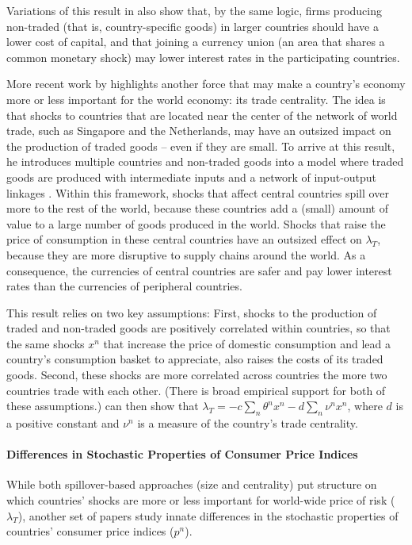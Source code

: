 \documentclass{ar-1col}
\begin{document}
Variations of this result in \citet{Hassan2013} also show that, by the same logic, firms producing non-traded (that is, country-specific goods) in larger countries should have a lower cost of capital, and that joining a currency union (an area that shares a common monetary shock) may lower interest rates in the participating countries.

More recent work by \citet{Richmond2019} highlights another force that may make a country's economy more or less important for the world economy: its trade centrality. The idea is that shocks to countries that are located near the center of the network of world trade, such as Singapore and the Netherlands, may have an outsized impact on the production of traded goods -- even if they are small. To arrive at this result, he introduces multiple countries and non-traded goods into a model where traded goods are produced with intermediate inputs and a network of input-output linkages \citep{LongPlosser1983, Acemogluetal2012}. Within this framework, shocks that affect central countries spill over more to the rest of the world, because these countries add a (small) amount of value to a large number of goods produced in the world. Shocks that raise the price of consumption in these central countries have an outsized effect on  $\lambda_T$, because they are more disruptive to supply chains around the world. As a consequence, the currencies of central countries are safer and pay lower interest rates than the currencies of peripheral countries.   

This result relies on two key assumptions: First, shocks to the production of traded and non-traded goods are positively correlated within countries, so that the same shocks $x^n$ that increase the price of domestic consumption and lead a country's consumption basket to appreciate, also raises the costs of its traded goods. Second, these shocks are more correlated across countries the more two countries trade with each other. (There is broad empirical support for both of these assumptions.) \citet{Richmond2019} can then show that $\lambda_{T} = -c \sum_{n} \theta^n x^n- d\sum_{n} \nu^n x^n$, where $d$ is a positive constant and $\nu^n$ is a measure of the country's trade centrality.


\paragraph*{Differences in Stochastic Properties of Consumer Price Indices}

While both spillover-based approaches (size and centrality) put structure on which countries' shocks are more or less important for world-wide price of risk ($\lambda_T$), another set of papers study innate differences in the stochastic properties of countries' consumer price indices ($p^n$).
\end{document}
